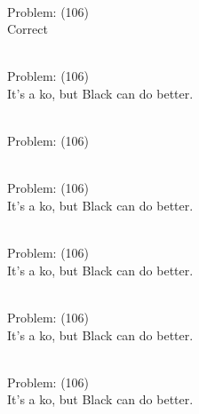 \documentclass[11pt]{article}
\begin{document}
\begin{minipage}[t]{0.5\textwidth}
  {\centering
  
\\
Problem: (106)\\
Correct\\
  }
\end{minipage}
\begin{minipage}[t]{0.5\textwidth}
  {\centering
  
\\
Problem: (106)\\
It's a ko, but Black can do better.\\
  }
\end{minipage}
\begin{minipage}[t]{0.5\textwidth}
  {\centering
  
\\
Problem: (106)\\
  }
\end{minipage}
\begin{minipage}[t]{0.5\textwidth}
  {\centering
  
\\
Problem: (106)\\
It's a ko, but Black can do better.\\
  }
\end{minipage}
\begin{minipage}[t]{0.5\textwidth}
  {\centering
  
\\
Problem: (106)\\
It's a ko, but Black can do better.\\
  }
\end{minipage}
\begin{minipage}[t]{0.5\textwidth}
  {\centering
  
\\
Problem: (106)\\
It's a ko, but Black can do better.\\
  }
\end{minipage}
\begin{minipage}[t]{0.5\textwidth}
  {\centering
  
\\
Problem: (106)\\
It's a ko, but Black can do better.\\
  }
\end{minipage}
\end{document}
